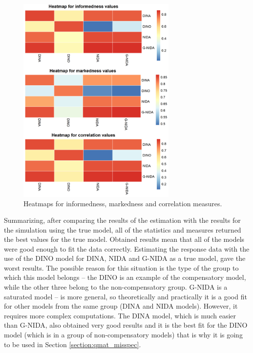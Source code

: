 \documentclass[english]{pwr_wmat_praca_dyplomowa}
\theoremstyle{plain}
\theoremstyle{definition}
\numberwithin{theorem}{chapter}
\begin{document}
\begin{figure}[h!]
	\centering
	\includegraphics[width=0.7\textwidth]{Heatmaps_absolute_fit.png}
	\caption{Heatmaps for informedness, markedness and correlation measures.}
	\label{heatmap_measures}
\end{figure}

Summarizing, after comparing the results of the estimation with the results for the simulation using the true model, all of the statistics and measures returned the best values for the true model. Obtained results mean that all of the models were good enough to fit the data correctly. Estimating the response data with the use of the DINO model for DINA, NIDA and G-NIDA as a true model, gave the worst results. The possible reason for this situation is the type of the group to which this model belongs -- the DINO is an example of the compensatory model, while the other three belong to the non-compensatory group. G-NIDA is a saturated model -- is more general, so theoretically and practically it is a good fit for other models from the same group (DINA and NIDA models). However, it requires more complex computations. The DINA model, which is much easier than G-NIDA, also obtained very good results and it is the best fit for the DINO model (which is in a group of non-compensatory models) that is why it is going to be used in Section \ref{section:qmat_misspec}.
  
\end{document}
